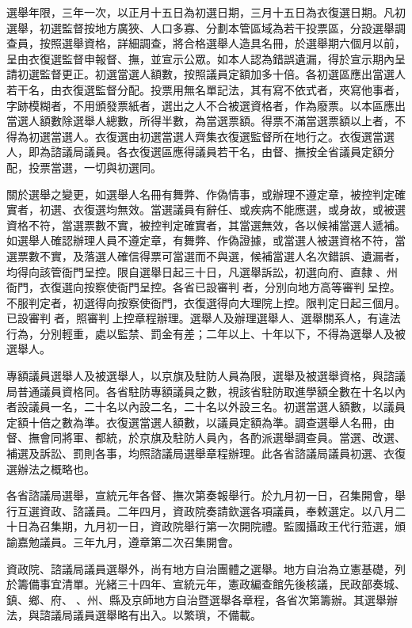 \begin{pinyinscope}
選舉年限，三年一次，以正月十五日為初選日期，三月十五日為衣復選日期。凡初選舉，初選監督按地方廣狹、人口多寡、分劃本管區域為若干投票區，分設選舉調查員，按照選舉資格，詳細調查，將合格選舉人造具名冊，於選舉期六個月以前，呈由衣復選監督申報督、撫，並宣示公眾。如本人認為錯誤遺漏，得於宣示期內呈請初選監督更正。初選當選人額數，按照議員定額加多十倍。各初選區應出當選人若干名，由衣復選監督分配。投票用無名單記法，其有寫不依式者，夾寫他事者，字跡模糊者，不用頒發票紙者，選出之人不合被選資格者，作為廢票。以本區應出當選人額數除選舉人總數，所得半數，為當選票額。得票不滿當選票額以上者，不得為初選當選人。衣復選由初選當選人齊集衣復選監督所在地行之。衣復選當選人，即為諮議局議員。各衣復選區應得議員若干名，由督、撫按全省議員定額分配，投票當選，一切與初選同。

關於選舉之變更，如選舉人名冊有舞弊、作偽情事，或辦理不遵定章，被控判定確實者，初選、衣復選均無效。當選議員有辭任、或疾病不能應選，或身故，或被選資格不符，當選票數不實，被控判定確實者，其當選無效，各以候補當選人遞補。如選舉人確認辦理人員不遵定章，有舞弊、作偽證據，或當選人被選資格不符，當選票數不實，及落選人確信得票可當選而不與選，候補當選人名次錯誤、遺漏者，均得向該管衙門呈控。限自選舉日起三十日，凡選舉訴訟，初選向府、直隸、州衙門，衣復選向按察使衙門呈控。各省已設審判者，分別向地方高等審判呈控。不服判定者，初選得向按察使衙門，衣復選得向大理院上控。限判定日起三個月。已設審判者，照審判上控章程辦理。選舉人及辦理選舉人、選舉關系人，有違法行為，分別輕重，處以監禁、罰金有差；二年以上、十年以下，不得為選舉人及被選舉人。

專額議員選舉人及被選舉人，以京旗及駐防人員為限，選舉及被選舉資格，與諮議局普通議員資格同。各省駐防專額議員之數，視該省駐防取進學額全數在十名以內者設議員一名，二十名以內設二名，二十名以外設三名。初選當選人額數，以議員定額十倍之數為準。衣復選當選人額數，以議員定額為準。調查選舉人名冊，由督、撫會同將軍、都統，於京旗及駐防人員內，各酌派選舉調查員。當選、改選、補選及訴訟、罰則各事，均照諮議局選舉章程辦理。此各省諮議局議員初選、衣復選辦法之概略也。

各省諮議局選舉，宣統元年各督、撫次第奏報舉行。於九月初一日，召集開會，舉行互選資政、諮議員。二年四月，資政院奏請欽選各項議員，奉敕選定。以八月二十日為召集期，九月初一日，資政院舉行第一次開院禮。監國攝政王代行蒞選，頒諭嘉勉議員。三年九月，遵章第二次召集開會。

資政院、諮議局議員選舉外，尚有地方自治團體之選舉。地方自治為立憲基礎，列於籌備事宜清單。光緒三十四年、宣統元年，憲政編查館先後核議，民政部奏城、鎮、鄉、府、、州、縣及京師地方自治暨選舉各章程，各省次第籌辦。其選舉辦法，與諮議局議員選舉略有出入。以繁瑣，不備載。


\end{pinyinscope}